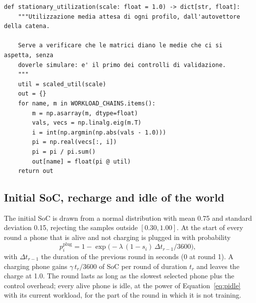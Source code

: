 \documentclass[11pt,a4paper]{article}
\begin{document}
\begin{lstlisting}[style=py,firstnumber=132,caption={\texttt{tesifl/device/workload.py}, lines 132--147}]
def stationary_utilization(scale: float = 1.0) -> dict[str, float]:
    """Utilizzazione media attesa di ogni profilo, dall'autovettore della catena.

    Serve a verificare che le matrici diano le medie che ci si aspetta, senza
    doverle simulare: e' il primo dei controlli di validazione.
    """
    util = scaled_util(scale)
    out = {}
    for name, m in WORKLOAD_CHAINS.items():
        m = np.asarray(m, dtype=float)
        vals, vecs = np.linalg.eig(m.T)
        i = int(np.argmin(np.abs(vals - 1.0)))
        pi = np.real(vecs[:, i])
        pi = pi / pi.sum()
        out[name] = float(pi @ util)
    return out
\end{lstlisting}

\subsection{Initial SoC, recharge and idle of the world}

The initial SoC is drawn from a normal distribution with mean 0.75 and standard
deviation 0.15, rejecting the samples outside $[0.30, 1.00]$. At the start of
every round a phone that is alive and not charging is plugged in with
probability
\begin{equation}
  p^{\mathrm{plug}}_i = 1 - \exp\!\bigl(-\lambda \, (1 - s_i) \, \Delta t_{r-1} / 3600\bigr) ,
  \label{eq:plug}
\end{equation}
with $\Delta t_{r-1}$ the duration of the previous round in seconds (0 at round
1). A charging phone gains $\gamma \, t_r / 3600$ of SoC per round of duration
$t_r$ and leaves the charge at 1.0. The round lasts as long as the slowest
selected phone plus the control overhead; every alive phone is idle, at the
power of Equation~\eqref{eq:pidle} with its current workload, for the part of
the round in which it is not training.
\end{document}

